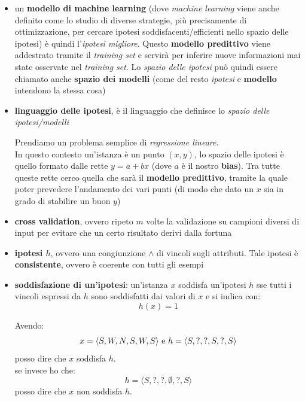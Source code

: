 \documentclass[a4paper,12pt, oneside]{book}
\begin{document}
\begin{shaded}
\begin{itemize}
    \item un \textbf{modello di machine learning} (dove \textit{machine
      learning} viene anche definito come lo studio di diverse strategie, più
    precisamente di ottimizzazione, per
    cercare ipotesi soddisfacenti/efficienti nello spazio delle ipotesi) è
    quindi l'\textit{ipotesi migliore}. Questo \textbf{modello predittivo} viene
    addestrato tramite il \textit{training set} e servirà per inferire nuove
    informazioni mai state osservate nel \textit{training set}. Lo
    \textit{spazio delle ipotesi} può quindi essere chiamato anche
    \textbf{spazio dei modelli} (come del resto \textit{ipotesi} e
    \textbf{modello} intendono la stessa cosa)
    \item \textbf{linguaggio delle ipotesi}, è il linguaggio che definisce lo
    \textit{spazio delle ipotesi/modelli}
    \begin{esempio}
      Prendiamo un problema semplice di \textit{regressione lineare}.\\
      In questo contesto un'istanza è un punto $(x,y)$, lo spazio delle ipotesi
      è quello formato dalle rette $y=a+bx$ (dove $a$ è il nostro
      \textbf{bias}). Tra tutte queste rette cerco quella che sarà il
      \textbf{modello predittivo}, tramite la quale poter prevedere l'andamento
      dei vari punti (di modo che dato un $x$ sia in grado di stabilire un buon
      $y$)
    \end{esempio}
    
    \item \textbf{cross validation}, ovvero ripeto $m$ volte la validazione su
    campioni diversi di input per evitare che un certo risultato derivi dalla
    fortuna 
    \item \textbf{ipotesi $h$}, ovvero una congiunzione $\land$ di vincoli sugli
    attributi. Tale ipotesi è \textbf{consistente}, ovvero è coerente con tutti
    gli esempi
    \item \textbf{soddisfazione di un'ipotesi}: un'istanza $x$ soddisfa
    un'ipotesi $h$ sse tutti i vincoli espressi da $h$ sono soddisfatti dai
    valori di $x$ e si indica con:
    \[h(x)=1\]
    \begin{esempio}
      Avendo:
      \[x=\langle S,W,N,S,W,S\rangle \mbox{ \textnormal{e}
        }h=\langle S,?,?,S,?,S\rangle\]
      posso dire che $x$ soddisfa $h$.\\
      se invece ho che:
      \[h=\langle S,?,?,\emptyset,?,S\rangle\]
      posso dire che $x$ non soddisfa $h$.
    \end{esempio}
  \end{itemize}
\end{shaded}
\end{document}
